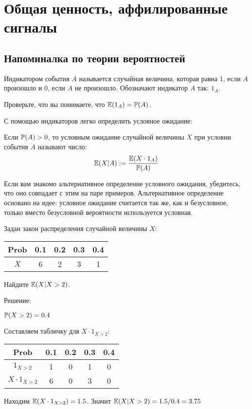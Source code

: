 \chapter{Общая ценность, аффилированные сигналы}


\section{Напоминалка по теории вероятностей}



\begin{mydef}
Индикатором события $ A $ называется случайная величина, которая равна 1, если $ A $ произошло и 0, если $ A $ не произошло. Обозначают индикатор $ A $ так: $ 1_{A} $.
\end{mydef}

Проверьте, что вы понимаете, что $ \E(1_{A})=\P(A) $.

С помощью индикаторов легко определить условное ожидание:

\begin{mydef}
Если $ \P(A)>0 $, то условным ожидание случайной величины $ X $ при условии события $ A $ называют число:
\[ \E(X|A):=\frac{\E(X\cdot 1_{A})}{\P(A)} \]
\label{posit_condition}
\end{mydef}

Если вам знакомо альтернативное определение условного ожидания, убедитесь, что оно совпадает с этим на паре примеров. Альтернативное определение основано на идее: условное ожидание считается так же, как и безусловное, только вместо безусловной вероятности используется условная.

\begin{myex} Задан закон распределения случайной величины $X$:


\begin{tabular}{c|cccc}
Prob & 0.1 & 0.2 & 0.3 & 0.4 \\
\hline
$X$ & 6 & 2 & 3 & 1 \\
\end{tabular}

Найдите $ \E(X|X>2) $.

Решение:

$\P(X>2)=0.4$

Составляем табличку для $ X\cdot 1_{X>2} $:

\begin{tabular}{c|cccc}
Prob & 0.1 & 0.2 & 0.3 & 0.4 \\
\hline
$1_{X>2}$ & 1 & 0 & 1 & 0 \\
$X\cdot 1_{X>2}$ & 6 & 0 & 3 & 0 \\
\end{tabular}

Находим $ \E(X\cdot 1_{X>2})=1.5 $. Значит $ \E(X|X>2)=1.5/0.4=3.75 $

\end{myex}


